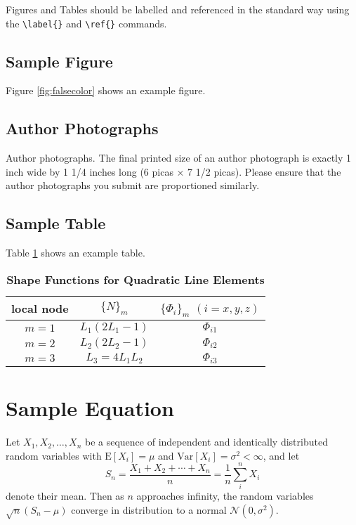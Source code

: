 \documentclass[9pt,twocolumn,twoside]{osajnl}
\begin{document}
Figures and Tables should be labelled and referenced in the standard way using the \verb|\label{}| and \verb|\ref{}| commands.

\subsection{Sample Figure}

Figure \ref{fig:falsecolor} shows an example figure.


\subsection{Author Photographs}
Author photographs. The final printed size of an author photograph is exactly 1 inch wide by 1 1/4 inches long (6 picas × 7 1/2 picas). Please ensure that the author photographs you submit are proportioned similarly.

\subsection{Sample Table}

Table \ref{tab:shapefunctions} shows an example table.

\begin{table}[htbp]
\centering
\caption{\bf Shape Functions for Quadratic Line Elements}
\begin{tabular}{ccc}
\hline
local node & $\{N\}_m$ & $\{\Phi_i\}_m$ $(i=x,y,z)$ \\
\hline
$m = 1$ & $L_1(2L_1-1)$ & $\Phi_{i1}$ \\
$m = 2$ & $L_2(2L_2-1)$ & $\Phi_{i2}$ \\
$m = 3$ & $L_3=4L_1L_2$ & $\Phi_{i3}$ \\
\hline
\end{tabular}
  \label{tab:shapefunctions}
\end{table}

\section{Sample Equation}

Let $X_1, X_2, \ldots, X_n$ be a sequence of independent and identically distributed random variables with $\text{E}[X_i] = \mu$ and $\text{Var}[X_i] = \sigma^2 < \infty$, and let
\begin{equation}
S_n = \frac{X_1 + X_2 + \cdots + X_n}{n}
      = \frac{1}{n}\sum_{i}^{n} X_i
\label{eq:refname1}
\end{equation}
denote their mean. Then as $n$ approaches infinity, the random variables $\sqrt{n}(S_n - \mu)$ converge in distribution to a normal $\mathcal{N}(0, \sigma^2)$.
\end{document}

